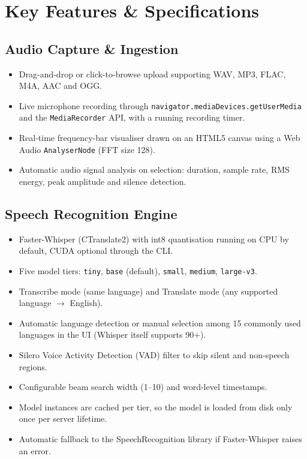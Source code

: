 \documentclass[11pt,a4paper]{article}
\begin{document}
\section{Key Features \& Specifications}
\subsection{Audio Capture \& Ingestion}
\begin{itemize}[leftmargin=1.2em,itemsep=1pt]
  \item Drag-and-drop or click-to-browse upload supporting WAV, MP3, FLAC, M4A, AAC and OGG.
  \item Live microphone recording through \texttt{navigator.mediaDevices.getUserMedia} and the \texttt{MediaRecorder} API, with a running recording timer.
  \item Real-time frequency-bar visualiser drawn on an HTML5 canvas using a Web Audio \texttt{AnalyserNode} (FFT size 128).
  \item Automatic audio signal analysis on selection: duration, sample rate, RMS energy, peak amplitude and silence detection.
\end{itemize}

\subsection{Speech Recognition Engine}
\begin{itemize}[leftmargin=1.2em,itemsep=1pt]
  \item Faster-Whisper (CTranslate2) with int8 quantisation running on CPU by default, CUDA optional through the CLI.
  \item Five model tiers: \texttt{tiny}, \texttt{base} (default), \texttt{small}, \texttt{medium}, \texttt{large-v3}.
  \item Transcribe mode (same language) and Translate mode (any supported language $\rightarrow$ English).
  \item Automatic language detection or manual selection among 15 commonly used languages in the UI (Whisper itself supports 90+).
  \item Silero Voice Activity Detection (VAD) filter to skip silent and non-speech regions.
  \item Configurable beam search width (1--10) and word-level timestamps.
  \item Model instances are cached per tier, so the model is loaded from disk only once per server lifetime.
  \item Automatic fallback to the SpeechRecognition library if Faster-Whisper raises an error.
\end{itemize}
\end{document}
